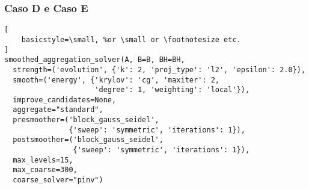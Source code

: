\subsubsection{Caso D e Caso E}

\begin{lstlisting}[
    basicstyle=\small, %or \small or \footnotesize etc.
]
smoothed_aggregation_solver(A, B=B, BH=BH,
  strength=('evolution', {'k': 2, 'proj_type': 'l2', 'epsilon': 2.0}),
  smooth=('energy', {'krylov': 'cg', 'maxiter': 2, 
                     'degree': 1, 'weighting': 'local'}),
  improve_candidates=None,
  aggregate="standard",
  presmoother=('block_gauss_seidel', 
               {'sweep': 'symmetric', 'iterations': 1}),
  postsmoother=('block_gauss_seidel', 
                {'sweep': 'symmetric', 'iterations': 1}),
  max_levels=15,
  max_coarse=300,
  coarse_solver="pinv")
\end{lstlisting}